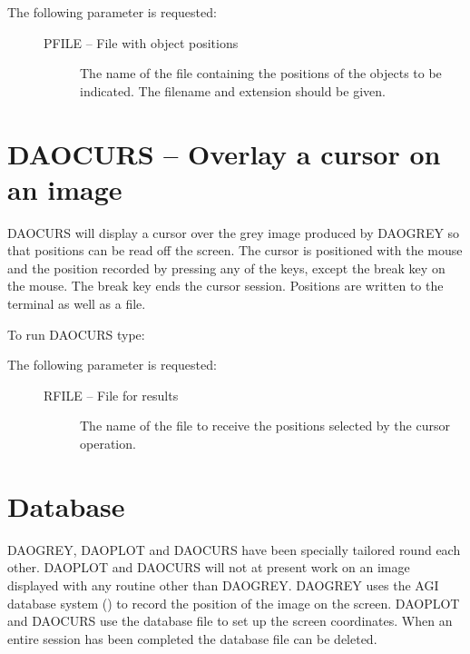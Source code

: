 \documentclass[11pt,nolof]{starlink}
\begin{document}
The following parameter is requested:

\begin{description}
\item[\mbox{}]\mbox{}
\begin{description}
\item[PFILE -- File with object positions]
The name of the file containing the positions of the objects to be indicated.
The filename and extension should be given.
\end{description}
\end{description}

\section{DAOCURS -- Overlay a cursor on an image}
\label{sec:daocurs}

DAOCURS will display a cursor over the grey image produced by DAOGREY so that
positions can be read off the screen. The cursor is positioned with the mouse and
the position recorded by pressing any of the keys, except the break key on the
mouse. The break key ends the cursor session. Positions are written to the terminal
as well as a file.

To run DAOCURS type:
\begin{terminalv}
\end{terminalv}

The following parameter is requested:

\begin{description}
\item[\mbox{}]\mbox{}
\begin{description}
\item[RFILE -- File for results]
The name of the file to receive the positions selected by the cursor operation.
\end{description}
\end{description}

\section{Database}
\label{sec:database}

DAOGREY, DAOPLOT and DAOCURS have been specially tailored round each other. DAOPLOT
and DAOCURS will not at present work on an image displayed with any routine other
than DAOGREY. DAOGREY uses the AGI database system () to
record the position of the image on the screen. DAOPLOT and DAOCURS use the
database file to set up the screen coordinates. When an entire session has been
completed the database file can be deleted.
\end{document}
